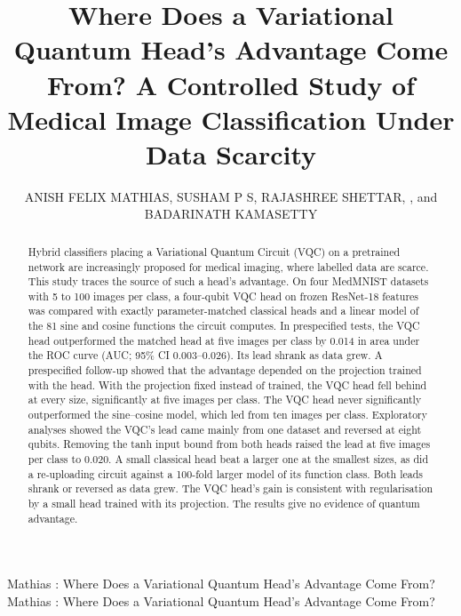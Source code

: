 \documentclass{ieeeaccess}
\begin{document}
\doi{[placeholder]}

\title{Where Does a Variational Quantum Head's Advantage Come From? A Controlled Study of Medical Image Classification Under Data Scarcity}

\author{\uppercase{Anish Felix Mathias},
\uppercase{Susham P S},
\uppercase{Rajashree Shettar}, ,
and \uppercase{Badarinath Kamasetty}}

\address[1]{Independent Researcher, Bengaluru, India}
\address[2]{Independent Researcher, Bengaluru, India}
\address[3]{Department of Computer Science and Engineering, R.~V. College of Engineering, Bengaluru 560059, India}
\address[4]{Department of Computer Science and Engineering, R.~V. College of Engineering, Bengaluru 560059, India}

\markboth
{Mathias \headeretal: Where Does a Variational Quantum Head's Advantage Come From?}
{Mathias \headeretal: Where Does a Variational Quantum Head's Advantage Come From?}


\begin{abstract}
Hybrid classifiers placing a Variational Quantum Circuit (VQC) on a pretrained network are increasingly proposed for medical imaging, where labelled data are scarce. This study traces the source of such a head's advantage. On four MedMNIST datasets with 5 to 100 images per class, a four-qubit VQC head on frozen ResNet-18 features was compared with exactly parameter-matched classical heads and a linear model of the 81 sine and cosine functions the circuit computes. In prespecified tests, the VQC head outperformed the matched head at five images per class by 0.014 in area under the ROC curve (AUC; 95\% CI 0.003--0.026). Its lead shrank as data grew. A prespecified follow-up showed that the advantage depended on the projection trained with the head. With the projection fixed instead of trained, the VQC head fell behind at every size, significantly at five images per class. The VQC head never significantly outperformed the sine--cosine model, which led from ten images per class. Exploratory analyses showed the VQC's lead came mainly from one dataset and reversed at eight qubits. Removing the tanh input bound from both heads raised the lead at five images per class to 0.020. A small classical head beat a larger one at the smallest sizes, as did a re-uploading circuit against a 100-fold larger model of its function class. Both leads shrank or reversed as data grew. The VQC head's gain is consistent with regularisation by a small head trained with its projection. The results give no evidence of quantum advantage.
\end{abstract}
\end{document}
